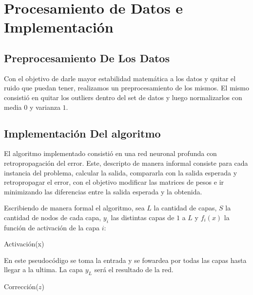 \section{Procesamiento de Datos e Implementación}
\subsection{Preprocesamiento De Los Datos}

Con el objetivo de darle mayor estabilidad matemática a los datos y quitar el ruido que puedan tener, realizamos un preprocesamiento de los mismos. El mismo consistió en quitar los outliers dentro del set de datos y luego normalizarlos con media $0$ y varianza $1$.

\subsection{Implementación Del algoritmo} 

El algoritmo implementado consistió en una red neuronal profunda con retropropagación del error. Este, descripto de manera informal consiste para cada instancia del problema, calcular la salida, compararla con la salida esperada y retropropagar el error, con el objetivo modificar las matrices de pesos e ir minimizando las diferencias entre la salida esperada y la obtenida.

Escribiendo de manera formal el algoritmo, sea $L$ la cantidad de capas, $S$ la cantidad de nodos de cada capa, $y_i$ las distintas capas de $1$ a $L$ y $f_i(x)$ la función de activación de la capa $i$:

\begin{algorithm}[h!]
\begin{algorithmic}[1]\parskip=1mm
 \caption{Activación(x)}
\end{algorithmic}
\end{algorithm}

En este pseudocódigo se toma la entrada y se fowardea por todas las capas hasta llegar a la ultima. La capa $y_L$ será el resultado de la red.

\pagebreak

\begin{algorithm}[h!]
\begin{algorithmic}[1]\parskip=1mm
 \caption{Corrección($z$)}
\end{algorithmic}
\end{algorithm}

